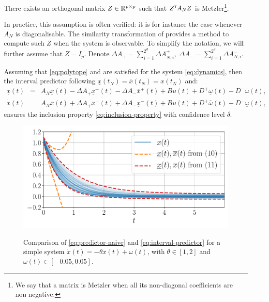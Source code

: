 \documentclass{article}
\begin{document}
\begin{assumption}
\label{assumpt:metzler}
There exists an orthogonal matrix $Z\in\mathbb{R}^{p\times p}$ such that $Z^{\mathsf{\scriptscriptstyle T}} A_N Z$ is Metzler\footnote{We say that a matrix is Metzler when all its non-diagonal coefficients are non-negative.}.
\end{assumption}
In practice, this assumption is often verified: it is for instance the case whenever $A_N$ is diagonalisable. The similarity transformation of \citep{Efimov2013} provides a method to compute such $Z$ when the system is observable. To simplify the notation, we will further assume that $Z = I_p$. Denote $
\Delta A_{+}=\sum_{i=1}^{2^d}\Delta A_{N,i}^{+},\;\Delta A_{-}=\sum_{i=1}^{2^d}\Delta A_{N,i}^{-}$.

\begin{proposition}
\label{prop:predictor}
Assuming that \eqref{eq:polytope} and  are satisfied for the system \eqref{eq:dynamics}, then the interval predictor following $ \underline{x}(t_N)=\overline{x}(t_N)={x}(t_N)$ and:
\begin{eqnarray}
\dot{\underline{x}}(t) & = & A_{N}\underline{x}(t)-\Delta A_{+}\underline{x}^{-}(t)-\Delta A_{-}\overline{x}^{+}(t)  +Bu(t)+D^{+}\underline{\omega}(t)-D^{-}\overline{\omega}(t),\label{eq:interval-predictor}\\
\dot{\overline{x}}(t) & = & A_{N}\overline{x}(t)+\Delta A_{+}\overline{x}^{+}(t)+\Delta A_{-}\underline{x}^{-}(t)  +Bu(t)+D^{+}\overline{\omega}(t)-D^{-}\underline{\omega}(t),\nonumber
\end{eqnarray}
ensures the inclusion property \eqref{eq:inclusion-property} with confidence level $\delta$.
\end{proposition}

\begin{figure}[tp]
	\centering
	{\includegraphics[trim={0 0.6cm 0 0.4cm}, clip, width=0.6\linewidth]{img/interval-predictor}}
	\caption{Comparison of \eqref{eq:predictor-naive} and \eqref{eq:interval-predictor} for a simple system $\dot{x}(t)=-\theta x(t)+\omega(t)$, with $\theta\in[1, 2]$ and $\omega(t) \in [-0.05, 0.05]$.}
	\label{fig:predictor_example}
\end{figure}
\end{document}
